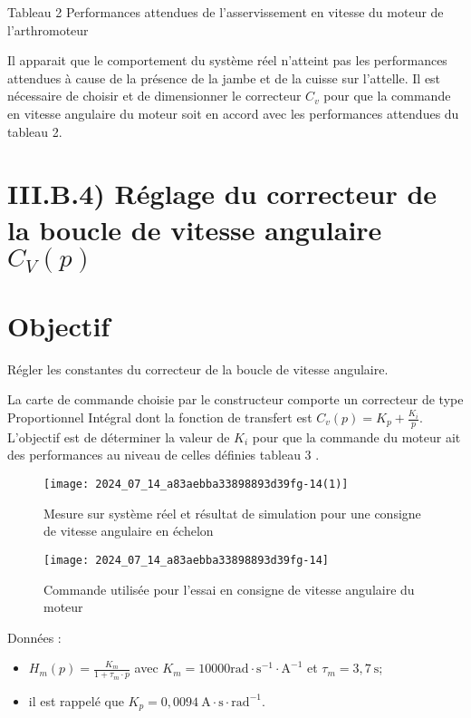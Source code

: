 Tableau 2 Performances attendues de l'asservissement en vitesse du moteur de l'arthromoteur


Il apparait que le comportement du système réel n'atteint pas les performances attendues à cause de la présence de la jambe et de la cuisse sur l'attelle. Il est nécessaire de choisir et de dimensionner le correcteur $C_{v}$ pour que la commande en vitesse angulaire du moteur soit en accord avec les performances attendues du tableau 2.

\section*{III.B.4) Réglage du correcteur de la boucle de vitesse angulaire $C_{V}(p)$}
\section*{Objectif}
Régler les constantes du correcteur de la boucle de vitesse angulaire.

La carte de commande choisie par le constructeur comporte un correcteur de type Proportionnel Intégral dont la fonction de transfert est $C_{v}(p)=K_{p}+\frac{K_{i}}{p}$. L'objectif est de déterminer la valeur de $K_{i}$ pour que la commande du moteur ait des performances au niveau de celles définies tableau 3 .

\begin{figure}[!h]\centering
\texttt{[image: 2024\_07\_14\_a83aebba33898893d39fg-14(1)]}
\caption{\label{fig:ccs_mp_2024:fig:23}Mesure sur système réel et résultat de simulation pour une consigne de vitesse angulaire en échelon}
\end{figure}
\begin{figure}[!h]\centering
\texttt{[image: 2024\_07\_14\_a83aebba33898893d39fg-14]}
\caption{\label{fig:ccs_mp_2024:fig:24}Commande utilisée pour l'essai en consigne de vitesse angulaire du moteur}
\end{figure}
Données :

\begin{itemize}
  \item $H_{m}(p)=\frac{K_{m}}{1+\tau_{m} \cdot p}$ avec $K_{m}=10000 \mathrm{rad} \cdot \mathrm{s}^{-1} \cdot \mathrm{A}^{-1}$ et $\tau_{m}=3,7 \mathrm{~s}$;

  \item il est rappelé que $K_{p}=0,0094 \mathrm{~A} \cdot \mathrm{s} \cdot \mathrm{rad}^{-1}$.

\end{itemize}

